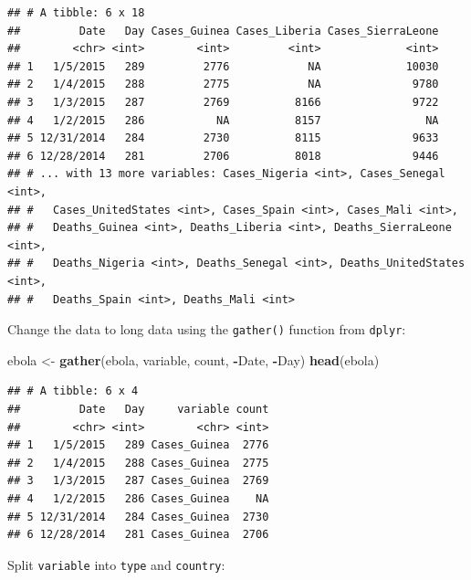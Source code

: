 \documentclass[]{book}
\makeatletter
\newenvironment{Shaded}{\begin{snugshade}}{\end{snugshade}}
\newcommand{\KeywordTok}[1]{\textcolor[rgb]{0.13,0.29,0.53}{\textbf{#1}}}
\newcommand{\DataTypeTok}[1]{\textcolor[rgb]{0.13,0.29,0.53}{#1}}
\newcommand{\DecValTok}[1]{\textcolor[rgb]{0.00,0.00,0.81}{#1}}
\newcommand{\StringTok}[1]{\textcolor[rgb]{0.31,0.60,0.02}{#1}}
\newcommand{\OtherTok}[1]{\textcolor[rgb]{0.56,0.35,0.01}{#1}}
\newcommand{\OperatorTok}[1]{\textcolor[rgb]{0.81,0.36,0.00}{\textbf{#1}}}
\newcommand{\NormalTok}[1]{#1}
\newenvironment{kframe}{%
\medskip{}
\setlength{\fboxsep}{.8em}
 \def\at@end@of@kframe{}%
 \ifinner\ifhmode%
  \def\at@end@of@kframe{\end{minipage}}%
  \begin{minipage}{\columnwidth}%
 \fi\fi%
 \def\FrameCommand##1{\hskip\@totalleftmargin \hskip-\fboxsep
 \colorbox{shadecolor}{##1}\hskip-\fboxsep
     \hskip-\linewidth \hskip-\@totalleftmargin \hskip\columnwidth}%
 \MakeFramed {\advance\hsize-\width
   \@totalleftmargin\z@ \linewidth\hsize
   \@setminipage}}%
 {\par\unskip\endMakeFramed%
 \at@end@of@kframe}
\renewenvironment{Shaded}{\begin{kframe}}{\end{kframe}}
\theoremstyle{definition}
\theoremstyle{definition}
\theoremstyle{definition}
\theoremstyle{remark}
\makeatother
\begin{document}
\begin{verbatim}
## # A tibble: 6 x 18
##         Date   Day Cases_Guinea Cases_Liberia Cases_SierraLeone
##        <chr> <int>        <int>         <int>             <int>
## 1   1/5/2015   289         2776            NA             10030
## 2   1/4/2015   288         2775            NA              9780
## 3   1/3/2015   287         2769          8166              9722
## 4   1/2/2015   286           NA          8157                NA
## 5 12/31/2014   284         2730          8115              9633
## 6 12/28/2014   281         2706          8018              9446
## # ... with 13 more variables: Cases_Nigeria <int>, Cases_Senegal <int>,
## #   Cases_UnitedStates <int>, Cases_Spain <int>, Cases_Mali <int>,
## #   Deaths_Guinea <int>, Deaths_Liberia <int>, Deaths_SierraLeone <int>,
## #   Deaths_Nigeria <int>, Deaths_Senegal <int>, Deaths_UnitedStates <int>,
## #   Deaths_Spain <int>, Deaths_Mali <int>
\end{verbatim}

Change the data to long data using the \texttt{gather()} function from
\texttt{dplyr}:

\begin{Shaded}
\begin{Highlighting}[]
\NormalTok{ebola <-}\StringTok{ }\KeywordTok{gather}\NormalTok{(ebola, variable, count, }\OperatorTok{-}\NormalTok{Date, }\OperatorTok{-}\NormalTok{Day)}
\KeywordTok{head}\NormalTok{(ebola)}
\end{Highlighting}
\end{Shaded}

\begin{verbatim}
## # A tibble: 6 x 4
##         Date   Day     variable count
##        <chr> <int>        <chr> <int>
## 1   1/5/2015   289 Cases_Guinea  2776
## 2   1/4/2015   288 Cases_Guinea  2775
## 3   1/3/2015   287 Cases_Guinea  2769
## 4   1/2/2015   286 Cases_Guinea    NA
## 5 12/31/2014   284 Cases_Guinea  2730
## 6 12/28/2014   281 Cases_Guinea  2706
\end{verbatim}

Split \texttt{variable} into \texttt{type} and \texttt{country}:

\begin{Shaded}
\end{Shaded}
\end{document}
